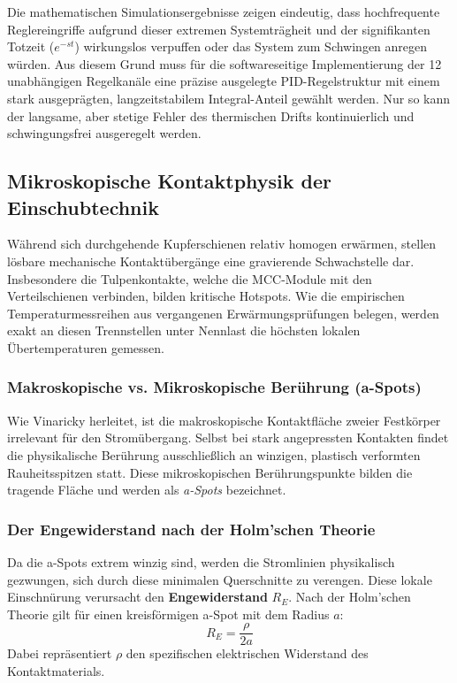 Die mathematischen Simulationsergebnisse zeigen eindeutig, dass hochfrequente Reglereingriffe aufgrund dieser extremen Systemträgheit und der signifikanten Totzeit ($e^{-st}$) wirkungslos verpuffen oder das System zum Schwingen anregen würden. Aus diesem Grund muss für die softwareseitige Implementierung der 12 unabhängigen Regelkanäle eine präzise ausgelegte PID-Regelstruktur mit einem stark ausgeprägten, langzeitstabilem Integral-Anteil gewählt werden. Nur so kann der langsame, aber stetige Fehler des thermischen Drifts kontinuierlich und schwingungsfrei ausgeregelt werden.

\subsection{Mikroskopische Kontaktphysik der Einschubtechnik}
\label{sec:mikro_kontaktphysik}

Während sich durchgehende Kupferschienen relativ homogen erwärmen, stellen lösbare mechanische Kontaktübergänge eine gravierende Schwachstelle dar. Insbesondere die Tulpenkontakte, welche die MCC-Module mit den Verteilschienen verbinden, bilden kritische Hotspots. Wie die empirischen Temperaturmessreihen aus vergangenen Erwärmungsprüfungen belegen, werden exakt an diesen Trennstellen unter Nennlast die höchsten lokalen Übertemperaturen gemessen.
\subsubsection{Makroskopische vs. Mikroskopische Berührung (a-Spots)}
Wie Vinaricky \cite{Vinaricky_Kontakte} herleitet, ist die makroskopische Kontaktfläche zweier Festkörper irrelevant für den Stromübergang. Selbst bei stark angepressten Kontakten findet die physikalische Berührung ausschließlich an winzigen, plastisch verformten Rauheitsspitzen statt. Diese mikroskopischen Berührungspunkte bilden die tragende Fläche und werden als \textit{a-Spots} bezeichnet.
\subsubsection{Der Engewiderstand nach der Holm'schen Theorie}
Da die a-Spots extrem winzig sind, werden die Stromlinien physikalisch gezwungen, sich durch diese minimalen Querschnitte zu verengen. Diese lokale Einschnürung verursacht den \textbf{Engewiderstand} $R_E$. Nach der Holm'schen Theorie gilt für einen kreisförmigen a-Spot mit dem Radius $a$:
\begin{equation}
    R_E = \frac{\rho}{2a}
\end{equation}
Dabei repräsentiert $\rho$ den spezifischen elektrischen Widerstand des Kontaktmaterials.
